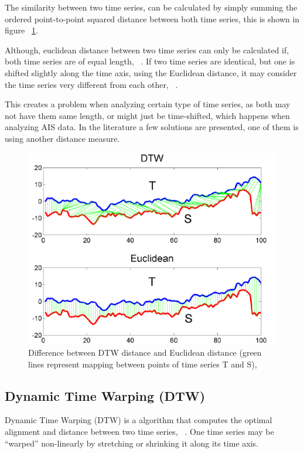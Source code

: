 The similarity between two time series, can be calculated by simply summing the ordered point-to-point squared distance between both time series, this is shown in figure ~\ref{fig:EuclidianDTW}. 

Although, euclidean distance between two time series can only be calculated if, both time series are of equal length, ~\cite{EuclidianRef}. 
If two time series are identical, but one is shifted slightly along the time axis, using the Euclidean distance, it may consider the time series very different from each other, ~\cite{Salvador2007}.

This creates a problem when analyzing certain type of time series, as both may not have them same length, or might just be time-shifted, which happens when analyzing AIS data. In the literature a few solutions are presented, one of them is using another distance measure. 

\begin{figure}[H]
	\centering
	\includegraphics[scale = .5]{figures/DTWEuclidean.png}
    \caption{Difference between DTW distance and Euclidean distance (green lines represent mapping between points of time series T and S),~\cite{EuclidianRef}}
    \label{fig:EuclidianDTW}
\end{figure}


\subsection{Dynamic Time Warping (DTW)}
Dynamic Time Warping (DTW) is a algorithm that computes the optimal alignment and distance between two time series, ~\cite{Seto2015}. One time series may be “warped” non-linearly by stretching or shrinking it along its time axis.

